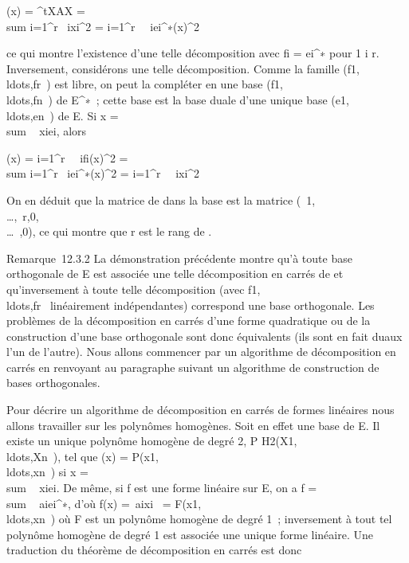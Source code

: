 \Phi(x) = ^tXAX = \\sum
i=1^r\alpha~ ixi^2 =
\sum i=1^r\alpha~~
iei^∗(x)^2

ce qui montre l'existence d'une telle décomposition avec fi =
ei^∗ pour 1 \leq i \leq r. Inversement, considérons une telle
décomposition. Comme la famille
(f1,\\ldots,fr~)
est libre, on peut la compléter en une base
(f1,\\ldots,fn~)
de E^∗~; cette base est la base duale d'une unique base
(e1,\\ldots,en~)
de E. Si x = \\sum ~
xiei, alors

\Phi(x) = \sum i=1^r\alpha~~
ifi(x)^2 = \\sum
i=1^r\alpha~ iei^∗(x)^2
= \sum i=1^r\alpha~~
ixi^2

On en déduit que la matrice de \Phi dans la base  est la matrice
\mathrmdiag(\alpha~1,\\\ldots,\alpha~r,0,\\\ldots~,0),
ce qui montre que r est le rang de \Phi.

Remarque~12.3.2 La démonstration précédente montre qu'à toute base
orthogonale de E est associée une telle décomposition en carrés de \Phi et
qu'inversement à toute telle décomposition (avec
f1,\\ldots,fr~
linéairement indépendantes) correspond une base orthogonale. Les
problèmes de la décomposition en carrés d'une forme quadratique ou de la
construction d'une base orthogonale sont donc équivalents (ils sont en
fait duaux l'un de l'autre). Nous allons commencer par un algorithme de
décomposition en carrés en renvoyant au paragraphe suivant un algorithme
de construction de bases orthogonales.

Pour décrire un algorithme de décomposition en carrés de formes
linéaires nous allons travailler sur les polynômes homogènes. Soit en
effet  une base de E. Il existe un unique polynôme homogène de degré 2,
P \in
H2(X1,\\ldots,Xn~),
tel que \Phi(x) =
P(x1,\\ldots,xn~)
si x = \\sum ~
xiei. De même, si f est une forme linéaire sur E, on
a f = \\sum ~
aiei^∗, d'où f(x) =\
\sum  aixi~ =
F(x1,\\ldots,xn~)
où F est un polynôme homogène de degré 1~; inversement à tout tel
polynôme homogène de degré 1 est associée une unique forme linéaire. Une
traduction du théorème de décomposition en carrés est donc

